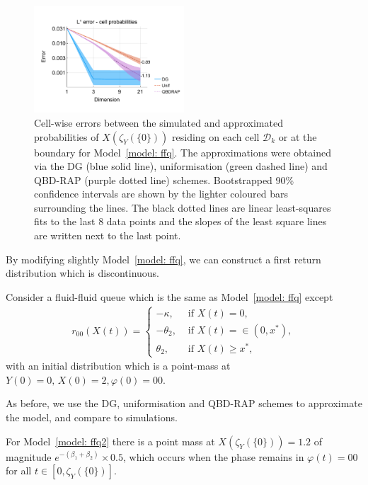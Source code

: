 \begin{figure}[h]
	\centering
	\includegraphics[width=0.5\textwidth,trim={0.75cm 0.8cm 0.25cm 1.25cm},clip]{chapter6/figs/ffq/cts/l1_cell_probs_error_formatted.pdf}%
	\caption{Cell-wise errors between the simulated and approximated probabilities of \(X(\zeta_{Y}(\{0\}))\) residing on each cell \(\mathcal D_k\) or at the boundary for Model~\ref{model: ffq}. The approximations were obtained via the DG (blue solid line), uniformisation (green dashed line) and QBD-RAP (purple dotted line) schemes. Bootstrapped 90\% confidence intervals are shown by the lighter coloured bars surrounding the lines. The black dotted lines are linear least-squares fits to the last 8 data points and the slopes of the least square lines are written next to the last point.} 
	\label{fig: ffq cell probs} 
\end{figure}
\exampleFloatBarrier
By modifying slightly Model~\ref{model: ffq}, we can construct a first return distribution which is discontinuous. 
\begin{model}\label{model: ffq2}
	Consider a fluid-fluid queue which is the same as Model~\ref{model: ffq} except 
	\begin{align}
		r_{00}(X(t)) = \begin{cases}
			-\kappa, & \mbox{ if }X(t)=0,\\
			-\theta_2, & \mbox{ if }X(t)=\in(0,x^*),\\
			\theta_2, & \mbox{ if }X(t)\geq x^*,
		\end{cases}
	\end{align}
	with an initial distribution which is a point-mass at \(Y(0)=0,\, X(0)=2, \varphi(0)=00\). 
\end{model}
As before, we use the DG, uniformisation and QBD-RAP schemes to approximate the model, and compare to simulations. 

For Model~\ref{model: ffq2} there is a point mass at \(X(\zeta_{Y}(\{0\}))=1.2\) of magnitude \(e^{-(\beta_1+\beta_2)}\times 0.5\), which occurs when the phase remains in \(\varphi(t)=00\) for all \(t\in [0,\zeta_{Y}(\{0\})]\).

